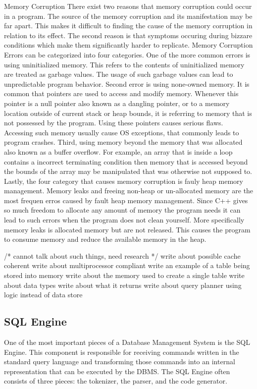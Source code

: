 \documentclass[letterpaper, 12pt]{article}
\begin{document}
	Memory Corruption
		There exist two reasons that memory corruption could occur in a program. The source of the memory corruption and its manifestation may be far apart. This makes it difficult to finding the cause of the memory corruption in relation to its effect. The second reason is that symptoms occuring during bizzare conditions which make them significantly harder to replicate. Memory Corruption Errors can be categorized into four categories. One of the more common errors is using uninitialized memory. This refers to the contents of uninitialized memory are treated as garbage values. The usage of such garbage values can lead to unpredictable program behavior. Second error is using none-owned memory. It is common that pointers are used to access and modify memory. Whenever this pointer is a null pointer also known as a dangling pointer, or to a memory location outside of current stack or heap bounds, it is referring to memory that is not possessed by the program. Using these pointers causes serious flaws. Accessing such memory usually cause OS exceptions, that commonly leads to program crashes. Third, using memory beyond the memory that was allocated also known as a buffer overflow. For example, an array that is inside a loop contains a incorrect terminating condition then memory that is accessed beyond the bounds of the array may be manipulated that was otherwise not supposed to. Lastly, the four category that causes memory corruption is fauly heap memory management. Memory leaks and freeing non-heap or un-allocated memory are the most frequen erros caused by fault heap memory management. Since C++ gives so much freedom to allocate any amount of memory the program needs it can lead to such errors when the program does not clean yourself. More specifically memory leaks is allocated memory but are not released. This causes the program to consume memory and reduce the available memory in the heap.

/* cannot talk about such things, need research */
write about possible cache coherent
write about multiprocessor compliant
write an example of a table being stored into memory
write about the memory used to create a single table
write about data types
write about what it returns
write about query planner using logic instead of data store

\subsection{SQL Engine}
One of the most important pieces of a Database Management System is the SQL Engine.
This component is responsible for receiving commands written in the standard query
language and transforming those commands into an internal representation that can be
executed by the DBMS. The SQL Engine often consists of three pieces: the tokenizer, the
parser, and the code generator.
\end{document}
